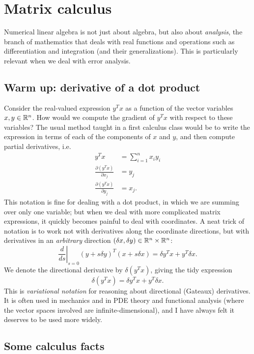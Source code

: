 \documentclass[12pt, leqno]{article} %
\begin{document}

\section{Matrix calculus}

Numerical linear algebra is not just about algebra, but also about
{\em analysis}, the branch of mathematics that deals with real
functions and operations such as differentiation and integration
(and their generalizations).  This is particularly relevant when
we deal with error analysis.

\subsection{Warm up: derivative of a dot product}

Consider the real-valued expression $y^T x$ as a function of
the vector variables $x, y \in \mathbb{R}^n$.  How would we compute
the gradient of $y^T x$ with respect to these variables?
The usual method taught in a first calculus class would be
to write the expression in terms of each of the components of $x$
and $y$, and then compute partial derivatives, i.e.
\begin{align*}
  y^T x &= \sum_{i=1}^n x_i y_i \\
  \frac{\partial (y^T x)}{\partial x_j} &= y_j \\
  \frac{\partial (y^T x)}{\partial y_j} &= x_j.
\end{align*}
This notation is fine for dealing with a dot product, in which
we are summing over only one variable; but when we deal with more
complicated matrix expressions, it quickly becomes painful to deal
with coordinates.  A neat trick of notation is to work not with
derivatives along the coordinate directions, but with derivatives
in an {\em arbitrary} direction
$(\delta x, \delta y) \in \mathbb{R}^n \times \mathbb{R}^n$:
\[
  \left. \frac{d}{ds} \right|_{s=0} (y+s \delta y)^T (x + s \delta x)
  = \delta y^T x + y^T \delta x.
\]
We denote the directional derivative by $\delta(y^T x)$, giving the
tidy expression
\[
  \delta(y^T x) = \delta y^T x + y^T \delta x.
\]
This is {\em variational notation} for reasoning about directional
(Gateaux) derivatives.  It is often used in
mechanics and in PDE theory and functional analysis
(where the vector spaces involved are infinite-dimensional),
and I have always felt it deserves to be used more widely.

\subsection{Some calculus facts}
\end{document}
